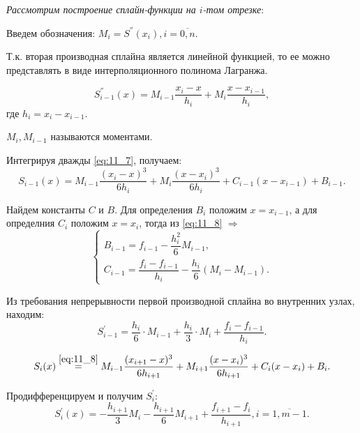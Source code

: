 \textit{Рассмотрим построение сплайн-функции на $i$-том отрезке}:

Введем обозначения: $M_i = S^{''}(x_i), i = \overline{0, n}$.

Т.к. вторая производная сплайна является линейной функцией, то ее можно представлять в виде интерполяционного полинома Лагранжа.

\begin{equation}\label{eq:11_7}
  S^{''}_{i - 1} (x) = M_{i - 1} \dfrac{x_i - x}{h_i} + M_i \dfrac{x - x_{i -1}}{h_i},
\end{equation}
где $h_i = x_i - x_{i - 1}$.

$M_i, M_{i - 1}$ называются моментами.

Интегрируя дважды \eqref{eq:11_7}, получаем:
\begin{equation}\label{eq:11_8}
  S_{i - 1}(x) = M_{i - 1} \dfrac{(x_i - x)^3}{6 h_i} + M_i \dfrac{(x - x_i)^3}{6 h_i} +  C_{i - 1} (x - x_{i - 1}) + B_{i - 1}.
\end{equation}

Найдем константы $C$ и $B$. Для определения $B_i$ положим $x = x_{i - 1}$, а для определния $C_i$ положим $x = x_{i}$, тогда из \eqref{eq:11_8} $\Rightarrow$
\begin{equation}\label{eq:11_9}
  \begin{cases} B_{i - 1} = f_{i - 1} - \dfrac{h_i^2}{6} M_{i - 1}, \\ C_{i - 1} = \dfrac{f_i - f_{i - 1}}{h_i} - \dfrac{h_i}{6}(M_i - M_{i - 1}). \end{cases}
\end{equation}

Из требования непрерывности первой производной сплайна во внутренних узлах, находим:
\begin{equation*}
  S^{'}_{i - 1} = \dfrac{h_i}{6} \cdot M_{i - 1} + \dfrac{h_i}{3} \cdot M_i + \dfrac{f_i - f_{i - 1}}{h_i}.
\end{equation*}

\begin{equation*}
  S_{i}(x) \overset{\eqref{eq:11_8}}{=} M_{i - 1} \dfrac{(x_{i+1} - x)^3}{6 h_{i+1}} + M_{i+1} \dfrac{(x - x_i)^3}{6 h_{i+1}} +  C_i (x - x_i) + B_i.
\end{equation*}

Продифференцируем и получим $S^{'}_{i}$:
\begin{equation}\label{eq:11_10}
  S^{'}_{i}(x) = - \dfrac{h_{i+1}}{3} M_{i}  - \dfrac{h_{i+1}}{6} M_{i+1} + \dfrac{f_{i+1} - f_i}{h_{i+1}}, i = \overline{1, m - 1}.
\end{equation}


